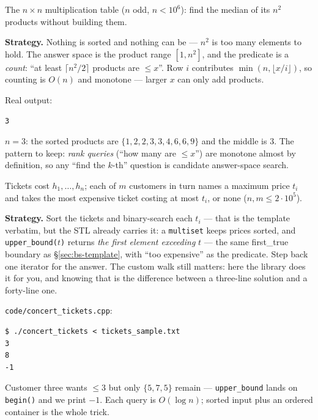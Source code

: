 \begin{example}\label{ex:multtable}
The $n \times n$ multiplication table ($n$ odd, $n < 10^6$): find the
median of its $n^2$ products without building them.
\par\smallskip
\textbf{Strategy.} Nothing is sorted and nothing can be --- $n^2$ is too
many elements to hold. The answer space is the product range
$[1, n^2]$, and the predicate is a \emph{count}: ``at least
$\lceil n^2/2 \rceil$ products are $\le x$''. Row $i$ contributes
$\min(n, \lfloor x/i \rfloor)$, so counting is $O(n)$ and monotone ---
larger $x$ can only add products.
\par\smallskip
\begin{solution}

Real output:
\begin{lstlisting}[numbers=none]
3
\end{lstlisting}
$n{=}3$: the sorted products are $\{1,2,2,3,3,4,6,6,9\}$ and the middle
is $3$. The pattern to keep: \emph{rank queries} (``how many are $\le
x$'') are monotone almost by definition, so any ``find the $k$-th''
question is candidate answer-space search.
\end{solution}
\end{example}

\begin{example}
\label{ex:concert}
Tickets cost $h_1,\dots,h_n$; each of $m$ customers in turn names a
maximum price $t_i$ and takes the most expensive ticket costing at
most $t_i$, or none ($n, m \le 2\cdot10^5$).
\par\smallskip
\textbf{Strategy.} Sort the tickets and binary-search each $t_i$ ---
that is the template verbatim, but the STL already carries it:
a \texttt{multiset} keeps prices sorted, and
\texttt{upper\_bound($t$)} returns \emph{the first element exceeding}
$t$ --- the same first\_true boundary as
\S\ref{sec:bs-template}, with ``too expensive'' as the predicate.
Step back one iterator for the answer. The custom walk still matters:
here the library does it for you, and knowing that is the difference
between a three-line solution and a forty-line one.
\par\smallskip
\begin{solution}
\texttt{code/concert\_tickets.cpp}:
\begin{lstlisting}[numbers=none]
$ ./concert_tickets < tickets_sample.txt
3
8
-1
\end{lstlisting}
Customer three wants $\le 3$ but only $\{5,7,5\}$ remain ---
\texttt{upper\_bound} lands on \texttt{begin()} and we print $-1$.
Each query is $O(\log n)$; sorted input plus an ordered container is
the whole trick.
\end{solution}
\end{example}

